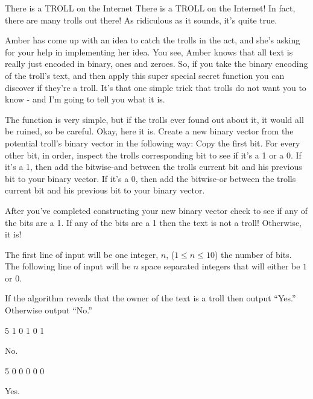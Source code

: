 \begin{problem}{There is a TROLL on the Internet}
There is a TROLL on the Internet!
In fact, there are many trolls out there!
As ridiculous as it sounds, it's quite true.

Amber has come up with an idea to catch the trolls in the act, and she's asking for your help in implementing her idea.
You see, Amber knows that all text is really just encoded in binary, ones and zeroes.
So, if you take the binary encoding of the troll's text, and then apply this super special secret function you can discover if they're a troll.
It's that one simple trick that trolls do not want you to know - and I'm going to tell you what it is.

The function is very simple, but if the trolls ever found out about it, it would all be ruined, so be careful.
Okay, here it is.
Create a new binary vector from the potential troll's binary vector in the following way:
Copy the first bit.
For every other bit, in order, inspect the trolls corresponding bit to see if it's a 1 or a 0.
If it's a 1, then add the bitwise-and between the trolls current bit and his previous bit to your binary vector.
If it's a 0, then add the bitwise-or between the trolls current bit and his previous bit to your binary vector.

After you've completed constructing your new binary vector check to see if any of the bits are a 1.
If any of the bits are a 1 then the text is not a troll!
Otherwise, it is!
\end{problem}

\begin{formalin}
The first line of input will be one integer, $n$, ($1 \leq n \leq 10$) the number of bits.
The following line of input will be $n$ space separated integers that will either be $1$ or $0$.
\end{formalin}

\begin{formalout}
If the algorithm reveals that the owner of the text is a troll then output ``Yes.''
Otherwise output ``No.''
\end{formalout}

\begin{datain}
5
1 0 1 0 1
\end{datain}
\begin{dataout}
No.
\end{dataout}

\begin{datain}
5
0 0 0 0 0
\end{datain}
\begin{dataout}
Yes.
\end{dataout}
